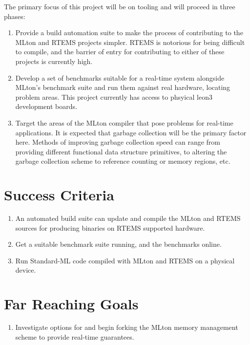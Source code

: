 \documentclass[12pt]{article}
\begin{document}
The primary focus of this project will be on tooling and will proceed in three phases:
\begin{enumerate}
\item Provide a build automation suite to make the process of contributing to the MLton and RTEMS projects simpler. RTEMS is notorious for being difficult to compile, and the barrier of entry for contributing to either of these projects is currently high.
\item Develop a set of benchmarks suitable for a real-time system alongside MLton's benchmark suite and run them against real hardware, locating problem areas. This project currently has access to phsyical leon3 development boards.
\item Target the areas of the MLton compiler that pose problems for real-time applications. It is expected that garbage collection will be the primary factor here. Methods of improving garbage collection speed can range from providing different functional data structure primitives, to altering the garbage collection scheme to reference counting or memory regions, etc.
\end{enumerate}

\section{Success Criteria}
\begin{enumerate}
\item An automated build suite can update and compile the MLton and RTEMS sources for producing binaries on RTEMS supported hardware.
\item Get a suitable benchmark suite running, and the benchmarks online.
\item Run Standard-ML code compiled with MLton and RTEMS on a physical device.
\end{enumerate}

\section{Far Reaching Goals}
\begin{enumerate}
\item Investigate options for and begin forking the MLton memory management scheme to provide real-time guarantees.
\end{enumerate}
\end{document}
